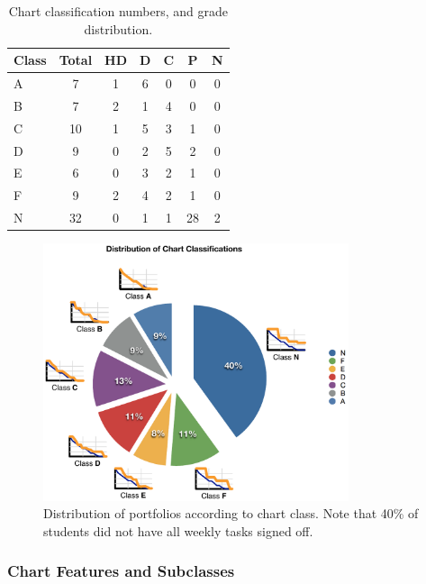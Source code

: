 \begin{table}[htbp]
  \footnotesize
  \renewcommand{\arraystretch}{1.3}
  \caption{Chart classification numbers, and grade distribution.}
  \label{tbl:chart_numbers}
  \centering
    \begin{tabular}{l|c|c|c|c|c|c}
        \textbf{Class} & \textbf{Total} & \textbf{HD} & \textbf{D} & \textbf{C} & \textbf{P}  & \textbf{N}  \\ \hline
        A     & 7     & 1  & 6 & 0 & 0  & 0  \\ 
        B     & 7     & 2  & 1 & 4 & 0  & 0  \\ 
        C     & 10    & 1  & 5 & 3 & 1  & 0  \\ 
        D     & 9     & 0  & 2 & 5 & 2  & 0  \\ 
        E     & 6     & 0  & 3 & 2 & 1  & 0  \\ 
        F     & 9     & 2  & 4 & 2 & 1  & 0  \\ 
        N     & 32    & 0  & 1 & 1 & 28 & 2  
    \end{tabular}
\end{table}

\begin{figure}[thb]
  \centering
  \includegraphics[width=0.8\textwidth]{DistributionOfChartClassifications}
  \caption{Distribution of portfolios according to chart class. Note that 40\% of students did not have all weekly tasks signed off.}
  \label{fig:chart_dist}
\end{figure}


\subsubsection{Chart Features and Subclasses} %
\label{sub:chart_subclasses}

